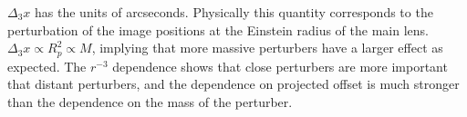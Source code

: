 $\Delta_3 x$ has the units of arcseconds. Physically this quantity corresponds to the perturbation of the image positions at the Einstein radius of the main lens. $\Delta_3 x \propto R_p^2\propto M$, implying that more massive perturbers have a larger effect as expected. The $r^{-3}$ dependence shows that close perturbers are more important that distant perturbers, and the dependence on projected offset is much stronger than the dependence on the mass of the perturber.